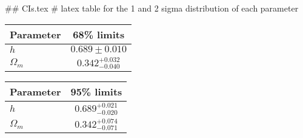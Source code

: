 ## CIs.tex
# latex table for the 1 and 2 sigma distribution of each parameter

\begin{tabular} { l  c}
 Parameter &  68\% limits\\
\hline
{\boldmath$h              $} & $0.689\pm 0.010            $\\
{\boldmath$\Omega_m       $} & $0.342^{+0.032}_{-0.040}   $\\
\hline
\end{tabular}

\begin{tabular} { l  c}
 Parameter &  95\% limits\\
\hline
{\boldmath$h              $} & $0.689^{+0.021}_{-0.020}   $\\
{\boldmath$\Omega_m       $} & $0.342^{+0.074}_{-0.071}   $\\
\hline
\end{tabular}
